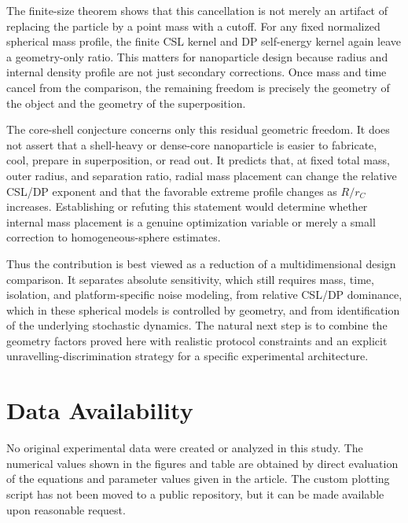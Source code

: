 \documentclass[
  aps,
  prd,
  preprint,
  notitlepage,
  superscriptaddress,
  nofootinbib,
  longbibliography
]{revtex4-2}
\begin{document}
The finite-size theorem shows that this cancellation is not merely an artifact of replacing the particle by a point mass with a cutoff. For any fixed normalized spherical mass profile, the finite CSL kernel and DP self-energy kernel again leave a geometry-only ratio. This matters for nanoparticle design because radius and internal density profile are not just secondary corrections. Once mass and time cancel from the comparison, the remaining freedom is precisely the geometry of the object and the geometry of the superposition.

The core-shell conjecture concerns only this residual geometric freedom. It does not assert that a shell-heavy or dense-core nanoparticle is easier to fabricate, cool, prepare in superposition, or read out. It predicts that, at fixed total mass, outer radius, and separation ratio, radial mass placement can change the relative CSL/DP exponent and that the favorable extreme profile changes as $R/r_C$ increases. Establishing or refuting this statement would determine whether internal mass placement is a genuine optimization variable or merely a small correction to homogeneous-sphere estimates.

Thus the contribution is best viewed as a reduction of a multidimensional design comparison. It separates absolute sensitivity, which still requires mass, time, isolation, and platform-specific noise modeling, from relative CSL/DP dominance, which in these spherical models is controlled by geometry, and from identification of the underlying stochastic dynamics. The natural next step is to combine the geometry factors proved here with realistic protocol constraints and an explicit unravelling-discrimination strategy for a specific experimental architecture.

\section*{Data Availability}

No original experimental data were created or analyzed in this study. The
numerical values shown in the figures and table are obtained by direct
evaluation of the equations and parameter values given in the article. The
custom plotting script has not been moved to a public repository, but it can be
made available upon reasonable request.


\end{document}
